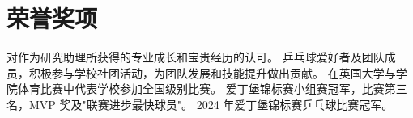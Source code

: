\section{荣誉奖项}
  \resumeSubHeadingListStart
      {对作为研究助理所获得的专业成长和宝贵经历的认可。}
      {乒乓球爱好者及团队成员，积极参与学校社团活动，为团队发展和技能提升做出贡献。}
      {在英国大学与学院体育比赛中代表学校参加全国级别比赛。}
      {爱丁堡锦标赛小组赛冠军，比赛第三名，MVP 奖及"联赛进步最快球员"。}
      {2024 年爱丁堡锦标赛乒乓球比赛冠军。}
  \resumeSubHeadingListEnd